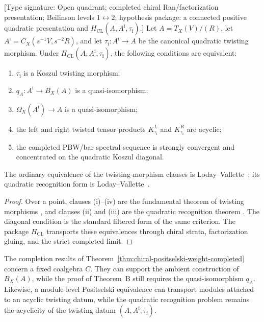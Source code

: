 \begin{theorem}
\label{thm:theorem-B-scope-quadratic-recognition}
\textup{[Type signature: Open quadrant; completed chiral
Ran/factorization presentation; Beilinson levels
\(1\leftrightarrow2\); hypothesis package: a connected positive
quadratic presentation and
\(H_{\mathrm{CL}}(A,A^{\mathrm i},\tau_{\mathrm i})\).]}
Let \(A=T_X(V)/(R)\), let
\(A^{\mathrm i}=C_X(s^{-1}V,s^{-2}R)\), and let
\(\tau_{\mathrm i}\colon A^{\mathrm i}\to A\) be the canonical
quadratic twisting morphism.  Under
\(H_{\mathrm{CL}}(A,A^{\mathrm i},\tau_{\mathrm i})\), the following
conditions are equivalent:
\begin{enumerate}[label=\textup{(\roman*)}]
\item \(\tau_{\mathrm i}\) is a Koszul twisting morphism;
\item \(q_A\colon A^{\mathrm i}\to B_X(A)\) is a quasi-isomorphism;
\item \(\Omega_X(A^{\mathrm i})\to A\) is a quasi-isomorphism;
\item the left and right twisted tensor products
 \(K^L_{\tau_{\mathrm i}}\) and \(K^R_{\tau_{\mathrm i}}\) are acyclic;
\item the completed PBW/bar spectral sequence is strongly convergent
 and concentrated on the quadratic Koszul diagonal.
\end{enumerate}
The ordinary equivalence of the twisting-morphism clauses is
Loday--Vallette~\cite[Theorem~2.3.2]{LV12}; its quadratic recognition
form is Loday--Vallette~\cite[Theorem~3.4.6]{LV12}.
\end{theorem}

\begin{proof}
Over a point, clauses \textup{(i)--(iv)} are the fundamental theorem
of twisting morphisms
\cite[Theorem~2.3.2]{LV12}, and clauses \textup{(ii)} and
\textup{(iii)} are the quadratic recognition theorem
\cite[Theorem~3.4.6]{LV12}.  The diagonal condition is the standard
filtered form of the same criterion.  The package
\(H_{\mathrm{CL}}\) transports these equivalences through chiral
strata, factorization gluing, and the strict completed limit.
\end{proof}

The completion results of
Theorem~\ref{thm:chiral-positselski-weight-completed} concern a fixed
coalgebra \(C\).  They can support the ambient construction of
\(B_X(A)\), while the proof of Theorem~B still requires the
quasi-isomorphism \(q_A\).  Likewise, a module-level Positselski
equivalence can transport modules attached to an acyclic twisting
datum, while the quadratic recognition problem remains the
acyclicity of the twisting datum
\((A,A^{\mathrm i},\tau_{\mathrm i})\).

